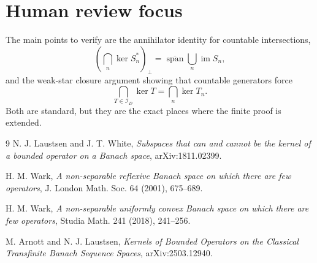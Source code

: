 \documentclass[11pt]{article}
\newcommand{\I}{\mathscr I}
\newcommand{\im}{\operatorname{im}}
\begin{document}
\section*{Human review focus}

The main points to verify are the annihilator identity for countable intersections,
\[
        \left(\bigcap_n\ker S_n^*\right)_\perp
        =\overline{\operatorname{span}}\bigcup_n\im S_n,
\]
and the weak-star closure argument showing that countable generators force
\[
        \bigcap_{T\in\I_D}\ker T=\bigcap_n\ker T_n.
\]
Both are standard, but they are the exact places where the finite proof is extended.

\begin{thebibliography}{9}
N. J. Laustsen and J. T. White, \emph{Subspaces that can and cannot be the kernel of a bounded operator on a Banach space}, arXiv:1811.02399.

H. M. Wark, \emph{A non-separable reflexive Banach space on which there are few operators}, J. London Math. Soc. 64 (2001), 675--689.

H. M. Wark, \emph{A non-separable uniformly convex Banach space on which there are few operators}, Studia Math. 241 (2018), 241--256.

M. Arnott and N. J. Laustsen, \emph{Kernels of Bounded Operators on the Classical Transfinite Banach Sequence Spaces}, arXiv:2503.12940.
\end{thebibliography}
\end{document}
